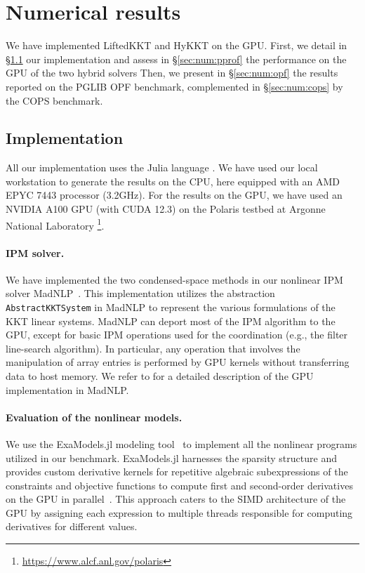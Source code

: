 \section{Numerical results}
We have implemented LiftedKKT and HyKKT on the GPU.
First, we detail in \S\ref{sec:num:implementation}
our implementation and assess in \S\ref{sec:num:pprof} the performance on the GPU of the two hybrid solvers
Then, we present in \S\ref{sec:num:opf} the results reported on the PGLIB OPF benchmark, complemented in \S\ref{sec:num:cops} by the COPS benchmark.

\subsection{Implementation}
\label{sec:num:implementation}
All our implementation uses the Julia language \cite{bezanson-edelman-karpinski-shah-2017}.
We have used our local workstation to generate the results on the CPU, here equipped
with an AMD EPYC 7443 processor (3.2GHz).
For the results on the GPU, we have used an NVIDIA A100 GPU (with CUDA 12.3) on
the Polaris testbed at Argonne National Laboratory
\footnote{\url{https://www.alcf.anl.gov/polaris}}.

\paragraph{IPM solver.}
We have implemented the two condensed-space methods in our nonlinear IPM solver MadNLP~\cite{shin2021graph}.
This implementation utilizes the abstraction {\tt AbstractKKTSystem}
in MadNLP to represent the various formulations of the KKT linear systems.
MadNLP can deport most of the IPM algorithm to the GPU, except for basic IPM operations used for the coordination (e.g., the filter line-search algorithm).
In particular, any operation that involves the manipulation of array entries is performed by GPU kernels without transferring data to host memory.
We refer to \cite{shin2023accelerating} for a detailed description of the GPU implementation in MadNLP.

\paragraph{Evaluation of the nonlinear models.}
We use the ExaModels.jl modeling tool~\cite{shin2023accelerating} to implement all the nonlinear programs utilized in our benchmark.
ExaModels.jl harnesses the sparsity structure and provides custom derivative kernels for repetitive algebraic subexpressions of the constraints and objective functions to compute first and second-order derivatives on the GPU in parallel~\cite{bischof1991exploiting,enzyme2021}.
This approach caters to the SIMD architecture of the GPU by assigning each expression to multiple threads responsible for computing derivatives for different values.

